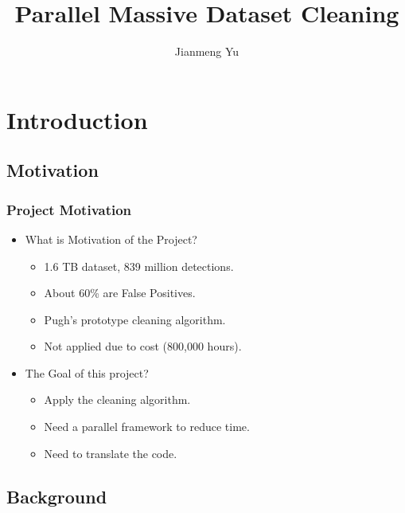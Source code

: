 \documentclass{beamer}[fullspacing]
\author{Jianmeng Yu}
\institute{Supervised by: Bob Fisher}
\title{Parallel Massive Dataset Cleaning}
\date{}
\begin{document}
\begin{frame}
\titlepage
\end{frame}


\begin{frame}
\tableofcontents
\end{frame}


\section{Introduction}

\subsection{Motivation}
\begin{frame}
\frametitle{Project Motivation}

\begin{itemize}
\item What is Motivation of the Project?
\begin{itemize}
\item 
1.6 TB dataset, 839 million detections. 
\item
About 60\% are False Positives.
\item
Pugh\cite{Pugh}'s prototype cleaning algorithm.
\item Not applied due to cost (800,000 hours)\cite{Yu}.
\end{itemize}
\item The Goal of this project?
\begin{itemize}
\item
Apply the cleaning algorithm.
\item 
Need a parallel framework to reduce time.
\item 
Need to translate the code.
\end{itemize}
\end{itemize}

\end{frame}



\subsection{Background}
\end{document}
